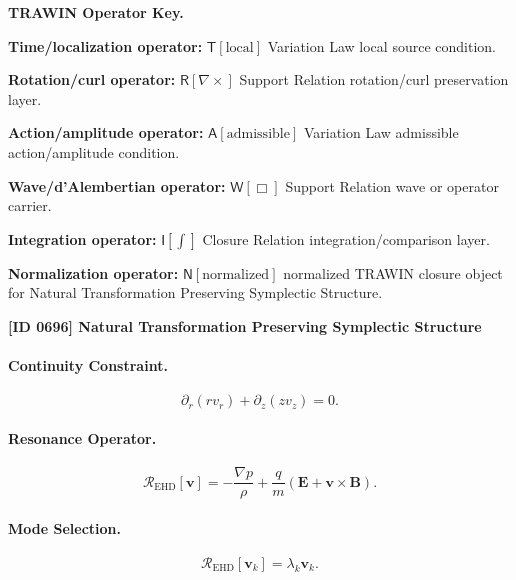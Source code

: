 \par\vspace{0.45\baselineskip}
\noindent\begin{minipage}[t]{\linewidth}
\begingroup
\small
\raggedright
\textbf{TRAWIN Operator Key.}\par
\noindent\textbf{Time/localization operator:} $\mathsf{T}\!\left[\mathrm{local}\right]$ Variation Law local source condition.\par
\noindent\textbf{Rotation/curl operator:} $\mathsf{R}\!\left[\nabla\times\right]$ Support Relation rotation/curl preservation layer.\par
\noindent\textbf{Action/amplitude operator:} $\mathsf{A}\!\left[\mathrm{admissible}\right]$ Variation Law admissible action/amplitude condition.\par
\noindent\textbf{Wave/d'Alembertian operator:} $\mathsf{W}\!\left[\Box\right]$ Support Relation wave or operator carrier.\par
\noindent\textbf{Integration operator:} $\mathsf{I}\!\left[\int\right]$ Closure Relation integration/comparison layer.\par
\noindent\textbf{Normalization operator:} $\mathsf{N}\!\left[\mathrm{normalized}\right]$ normalized TRAWIN closure object for Natural Transformation Preserving Symplectic Structure.\par
\endgroup
\end{minipage}

\clearpage
\noindent\textbf{[ID 0696] Natural Transformation Preserving Symplectic Structure}\par
\vspace{0.35em}
\paragraph{Continuity Constraint.}
\begin{equation}
\partial_r(rv_r)+\partial_z(zv_z)=0.
\end{equation}

\paragraph{Resonance Operator.}
\begin{equation}
\mathcal{R}_{\mathrm{EHD}}[\mathbf{v}]
=
-\frac{\nabla p}{\rho}
+
\frac{q}{m}
(\mathbf{E}+\mathbf{v}\times\mathbf{B}).
\end{equation}

\paragraph{Mode Selection.}
\begin{equation}
\mathcal{R}_{\mathrm{EHD}}[\mathbf{v}_k]
=
\lambda_k\mathbf{v}_k.
\end{equation}

